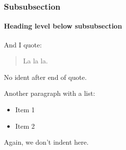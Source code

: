 \subsubsection{Subsubsection}

\paragraph{Heading level below subsubsection}
\label{sec:paragraph}

And I quote: 
%
\begin{quote}
La la la.
\end{quote}
%
\noindent No ident after end of quote.  

Another paragraph with a list:
%
\begin{itemize}
%  
\item Item 1
%
\item Item 2
%
\end{itemize}
%
\noindent Again, we don't indent here.